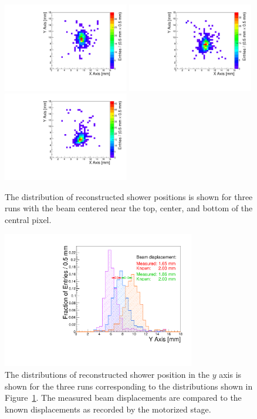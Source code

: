 \begin{figure}[htbp] \centering
\includegraphics[width=0.49\textwidth]{Images/centers/run30dist.pdf}
\includegraphics[width=0.49\textwidth]{Images/centers/run32dist.pdf}
\includegraphics[width=0.49\textwidth]{Images/centers/run34dist.pdf}
\caption{The distribution of reconstructed shower positions is shown for three
runs with the beam centered near the top, center, and bottom of the central
pixel. } \label{fig:EMShowerPositions} \end{figure} \begin{figure}[htbp]

\centering
\includegraphics[width=0.75\textwidth]{Images/centers/superimposed.pdf}
\caption{The distributions of reconstructed shower position in the $y$ axis is
shown for the three runs corresponding to the distributions shown in
Figure~\ref{fig:EMShowerPositions}. The measured beam displacements are compared
to the known displacements as recorded by the motorized stage. }
\label{fig:EMShowerYPositionComparison} 
\end{figure} 

